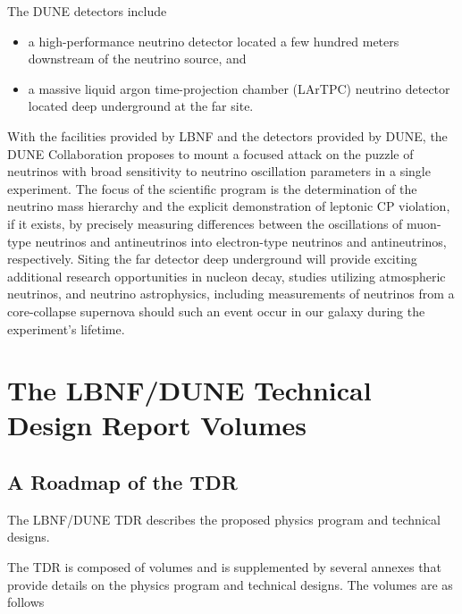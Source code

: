 The DUNE detectors include
\begin{itemize}
\item a high-performance neutrino detector 
located a few hundred meters downstream of the neutrino source, and
\item a massive liquid argon time-projection chamber (LArTPC) neutrino detector located deep underground at the far site.
\end{itemize}

With the facilities provided by LBNF and the detectors provided by
DUNE, the DUNE Collaboration proposes to mount a focused attack on the
puzzle of neutrinos with broad sensitivity to neutrino oscillation
parameters in a single experiment.  The focus of the scientific
program is the determination of the neutrino mass hierarchy and the
explicit demonstration of leptonic CP violation, if it exists, by
precisely measuring differences between the oscillations of muon-type
neutrinos and antineutrinos into electron-type neutrinos and
antineutrinos, respectively. Siting the far detector deep underground
will provide exciting additional research opportunities in nucleon
decay, studies utilizing atmospheric neutrinos, and neutrino
astrophysics, including measurements of neutrinos from a core-collapse
supernova should such an event occur in our galaxy during the
experiment's lifetime.

\section{The LBNF/DUNE Technical Design Report Volumes}

\subsection{A Roadmap of the TDR}

The LBNF/DUNE TDR describes the proposed physics program and 
technical designs.

The TDR is composed of  volumes and is supplemented by several annexes that 
provide details on the physics program and technical designs. The volumes are as follows

